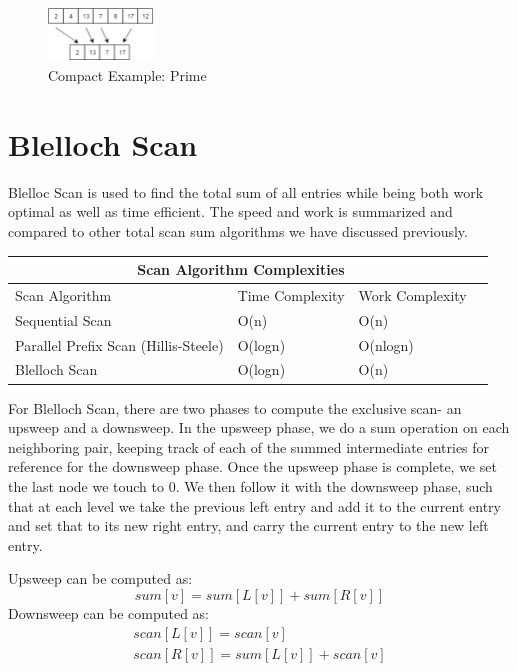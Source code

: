 \documentclass[twoside]{article}
\begin{document}
\begin{figure}[ht]
  \centering
  \includegraphics[width=0.25\textwidth]{./Compact.png} 
  \caption{Compact Example: Prime}
  \label{fig:compact}
\end{figure}

\section{Blelloch Scan}
Blelloc Scan is used to find the total sum of all entries while being both work optimal as well as time efficient. The speed and work is summarized and compared to other total scan sum algorithms we have discussed previously. 

\begin{centering}
\begin{tabular}{ |p{8cm}||p{3cm}|p{3cm}|p{3cm}|  }
 \hline
 \multicolumn{3}{|c|}{Scan Algorithm Complexities} \\
 \hline
Scan Algorithm & Time Complexity & Work Complexity\\
 \hline
 Sequential Scan & O(n) & O(n)\\
 Parallel Prefix Scan (Hillis-Steele) & O(logn)& O(nlogn)\\
 Blelloch Scan & O(logn) & O(n) \\
 \hline
\end{tabular}
\end{centering}


For Blelloch Scan, there are two phases to compute the exclusive scan- an upsweep and a downsweep. In the upsweep phase, we do a sum operation on each neighboring pair, keeping track of each of the summed intermediate entries for reference for the downsweep phase. Once the upsweep phase is complete, we set the last node we touch to 0. We then follow it with the downsweep phase, such that at each level we take the previous left entry and add it to the current entry and set that to its new right entry, and carry the current entry to the new left entry.  

Upsweep can be computed as:
\begin{equation}sum[v] = sum[L[v]] + sum[R[v]]
\end{equation}
Downsweep can be computed as:
\begin{equation}
\begin{split}
scan[L[v]] = scan[v] \\
scan[R[v]] = sum[L[v]] + scan[v]
\end{split}
\end{equation}
\end{document}
